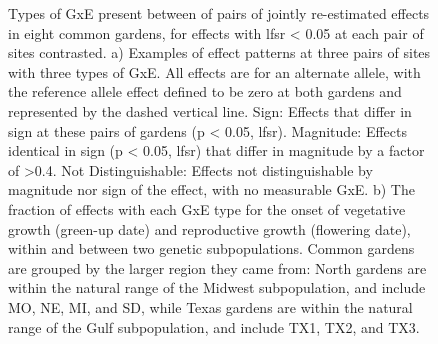 \documentclass[
  9pt,
  twocolumn,
  twoside]{pnas-new}
\begin{document}
\begin{figure}


\caption{\label{fig-effects}Types of GxE present between of pairs of
jointly re-estimated effects in eight common gardens, for effects with
lfsr \textless{} 0.05 at each pair of sites contrasted. a) Examples of
effect patterns at three pairs of sites with three types of GxE. All
effects are for an alternate allele, with the reference allele effect
defined to be zero at both gardens and represented by the dashed
vertical line. Sign: Effects that differ in sign at these pairs of
gardens (p \textless{} 0.05, lfsr). Magnitude: Effects identical in sign
(p \textless{} 0.05, lfsr) that differ in magnitude by a factor of
\textgreater0.4. Not Distinguishable: Effects not distinguishable by
magnitude nor sign of the effect, with no measurable GxE. b) The
fraction of effects with each GxE type for the onset of vegetative
growth (green-up date) and reproductive growth (flowering date), within
and between two genetic subpopulations. Common gardens are grouped by
the larger region they came from: North gardens are within the natural
range of the Midwest subpopulation, and include MO, NE, MI, and SD,
while Texas gardens are within the natural range of the Gulf
subpopulation, and include TX1, TX2, and TX3.}

\end{figure}%
\end{document}
